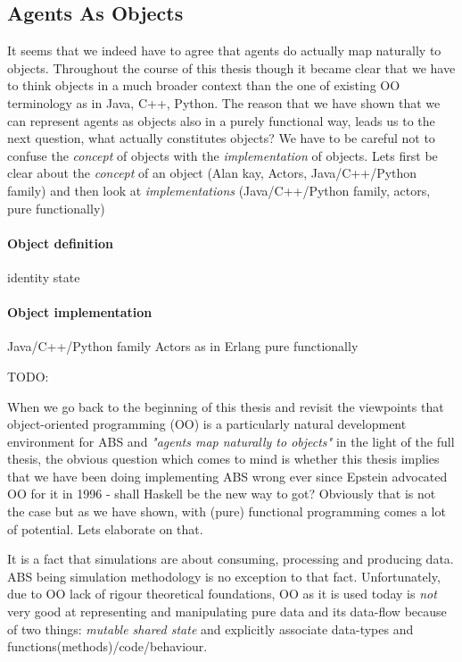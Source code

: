 \subsection{Agents As Objects}


It seems that we indeed have to agree that agents do actually map naturally to objects. Throughout the course of this thesis though it became clear that we have to think objects in a much broader context than the one of existing OO terminology as in Java, C++, Python. The reason that we have shown that we can represent agents as objects also in a purely functional way, leads us to the next question, what actually constitutes objects? We have to be careful not to confuse the \textit{concept} of objects with the \textit{implementation} of objects. Lets first be clear about the \textit{concept} of an object (Alan kay, Actors, Java/C++/Python family) and then look at \textit{implementations} (Java/C++/Python family, actors, pure functionally)

\paragraph{Object definition}
identity
state


\paragraph{Object implementation}
Java/C++/Python family
Actors as in Erlang
pure functionally


TODO: 

When we go back to the beginning of this thesis and revisit the viewpoints that object-oriented programming (OO) is a particularly natural development environment for ABS \cite{epstein_growing_1996} and \textit{"agents map naturally to objects"} \cite{north_managing_2007} in the light of the full thesis, the obvious question which comes to mind is whether this thesis implies that we have been doing implementing ABS wrong ever since Epstein advocated OO for it in 1996 - shall Haskell be the new way to got? Obviously that is not the case but as we have shown, with (pure) functional programming comes a lot of potential. Lets elaborate on that.

\medskip

It is a fact that simulations are about consuming, processing and producing data. ABS being simulation methodology is no exception to that fact. Unfortunately, due to OO lack of rigour theoretical foundations, OO as it is used today is \textit{not} very good at representing and manipulating pure data and its data-flow because of two things: \textit{mutable shared state} and explicitly associate data-types and functions(methods)/code/behaviour.

